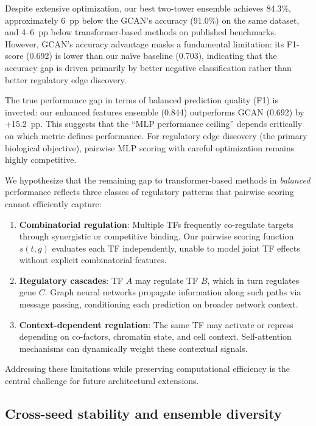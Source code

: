 \documentclass[10pt,twocolumn]{article}
\begin{document}
Despite extensive optimization, our best two-tower ensemble achieves 84.3\%, approximately 6~pp below the GCAN's accuracy (91.0\%) on the same dataset, and 4--6~pp below transformer-based methods on published benchmarks.
However, GCAN's accuracy advantage masks a fundamental limitation: its F1-score (0.692) is lower than our na\"{i}ve baseline (0.703), indicating that the accuracy gap is driven primarily by better negative classification rather than better regulatory edge discovery.

The true performance gap in terms of balanced prediction quality (F1) is inverted: our enhanced features ensemble (0.844) outperforms GCAN (0.692) by +15.2~pp.
This suggests that the ``MLP performance ceiling'' depends critically on which metric defines performance.
For regulatory edge discovery (the primary biological objective), pairwise MLP scoring with careful optimization remains highly competitive.

We hypothesize that the remaining gap to transformer-based methods in \textit{balanced} performance reflects three classes of regulatory patterns that pairwise scoring cannot efficiently capture:

\begin{enumerate}
    \item \textbf{Combinatorial regulation}: Multiple TFs frequently co-regulate targets through synergistic or competitive binding. Our pairwise scoring function $s(t, g)$ evaluates each TF independently, unable to model joint TF effects without explicit combinatorial features.

    \item \textbf{Regulatory cascades}: TF $A$ may regulate TF $B$, which in turn regulates gene $C$. Graph neural networks propagate information along such paths via message passing, conditioning each prediction on broader network context.

    \item \textbf{Context-dependent regulation}: The same TF may activate or repress depending on co-factors, chromatin state, and cell context. Self-attention mechanisms can dynamically weight these contextual signals.
\end{enumerate}

\noindent Addressing these limitations while preserving computational efficiency is the central challenge for future architectural extensions.

\subsection{Cross-seed stability and ensemble diversity}
\end{document}
